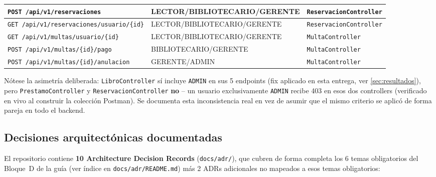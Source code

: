 \documentclass[12pt,a4paper]{article}
\begin{document}
\begin{center}
\begin{longtable}{|l|l|l|}
\texttt{POST /api/v1/reservaciones} & LECTOR/BIBLIOTECARIO/GERENTE & \texttt{ReservacionController} \\ \hline
\texttt{GET /api/v1/reservaciones/usuario/\{id\}} & LECTOR/BIBLIOTECARIO/GERENTE & \texttt{ReservacionController} \\ \hline
\texttt{GET /api/v1/multas/usuario/\{id\}} & LECTOR/BIBLIOTECARIO/GERENTE & \texttt{MultaController} \\ \hline
\texttt{POST /api/v1/multas/\{id\}/pago} & BIBLIOTECARIO/GERENTE & \texttt{MultaController} \\ \hline
\texttt{POST /api/v1/multas/\{id\}/anulacion} & GERENTE/ADMIN & \texttt{MultaController} \\ \hline
\end{longtable}
\end{center}

Nótese la asimetría deliberada: \texttt{LibroController} sí incluye
\texttt{ADMIN} en sus 5 endpoints (fix aplicado en esta entrega, ver
\autoref{sec:resultados}), pero \texttt{PrestamoController} y
\texttt{ReservacionController} \textbf{no} -- un usuario exclusivamente
\texttt{ADMIN} recibe 403 en esos dos controllers (verificado en vivo al
construir la colección Postman). Se documenta esta inconsistencia real en
vez de asumir que el mismo criterio se aplicó de forma pareja en todo el
backend.

\subsection{Decisiones arquitectónicas documentadas}

El repositorio contiene \textbf{10 Architecture Decision Records}
(\texttt{docs/adr/}), que cubren de forma completa los 6 temas
obligatorios del Bloque~D de la guía (ver índice en
\texttt{docs/adr/README.md}) más 2 ADRs adicionales no mapeados a esos
temas obligatorios:
\end{document}
